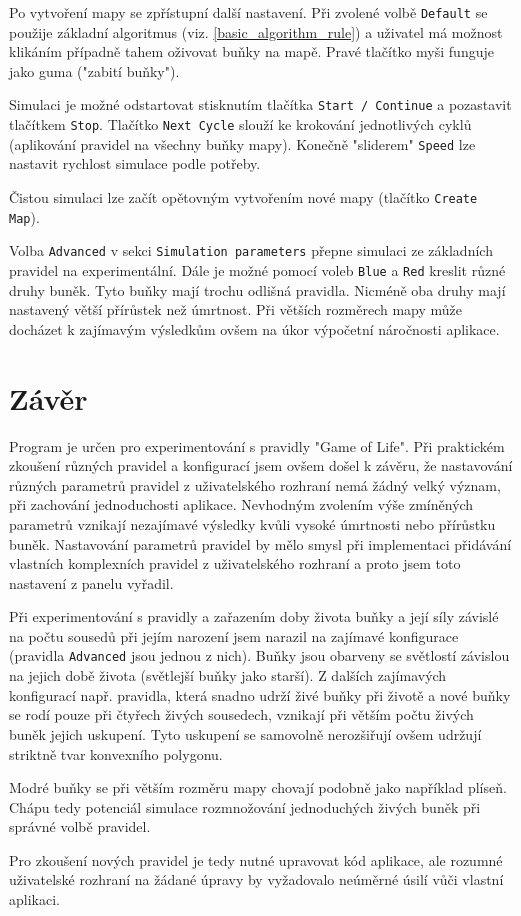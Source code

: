 \documentclass[12pt]{article}
\begin{document}
Po vytvoření mapy se zpřístupní další nastavení. Při zvolené volbě \texttt{Default} se použije základní algoritmus (viz. \ref{basic_algorithm_rule}) a uživatel má možnost klikáním případně tahem oživovat buňky na mapě. Pravé tlačítko myši funguje jako guma ("zabití buňky").

Simulaci je možné odstartovat stisknutím tlačítka \texttt{Start / Continue} a pozastavit tlačítkem \texttt{Stop}. Tlačítko \texttt{Next Cycle} slouží ke krokování jednotlivých cyklů (aplikování pravidel na všechny buňky mapy). Konečně "sliderem" \texttt{Speed} lze nastavit rychlost simulace podle potřeby.

Čistou simulaci lze začít opětovným vytvořením nové mapy (tlačítko \texttt{Create Map}).

Volba \texttt{Advanced} v sekci \texttt{Simulation parameters} přepne simulaci ze základních pravidel na experimentální. Dále je možné pomocí voleb \texttt{Blue} a \texttt{Red} kreslit různé druhy buněk. Tyto buňky mají trochu odlišná pravidla. Nicméně oba druhy mají nastavený větší přírůstek než úmrtnost. Při větších rozměrech mapy může docházet k zajímavým výsledkům ovšem na úkor výpočetní náročnosti aplikace.

\section{Závěr}
Program je určen pro experimentování s pravidly "Game of Life". Při praktickém zkoušení různých pravidel a konfigurací jsem ovšem došel k závěru, že nastavování různých parametrů pravidel z uživatelského rozhraní nemá žádný velký význam, při zachování jednoduchosti aplikace. Nevhodným zvolením výše zmíněných parametrů vznikají nezajímavé výsledky kvůli vysoké úmrtnosti nebo přírůstku buněk. Nastavování parametrů pravidel by mělo smysl při implementaci přidávání vlastních komplexních pravidel z uživatelského rozhraní a proto jsem toto nastavení z panelu vyřadil. 

Při experimentování s pravidly a zařazením doby života buňky a její síly závislé na počtu sousedů při jejím narození jsem narazil na zajímavé konfigurace (pravidla \texttt{Advanced} jsou jednou z nich). Buňky jsou obarveny se světlostí závislou na jejich době života (světlejší buňky jako starší). Z dalších zajímavých konfigurací např. pravidla, která snadno udrží živé buňky při životě a nové buňky se rodí pouze při čtyřech živých sousedech, vznikají při větším počtu živých buněk jejich uskupení. Tyto uskupení se samovolně nerozšiřují ovšem udržují striktně tvar konvexního polygonu.  

Modré buňky se při větším rozměru mapy chovají podobně jako například plíseň. Chápu tedy potenciál simulace rozmnožování jednoduchých živých buněk při správné volbě pravidel.

Pro zkoušení nových pravidel je tedy nutné upravovat kód aplikace, ale rozumné uživatelské rozhraní na žádané úpravy by vyžadovalo neúměrné úsilí vůči vlastní aplikaci.
\end{document}
